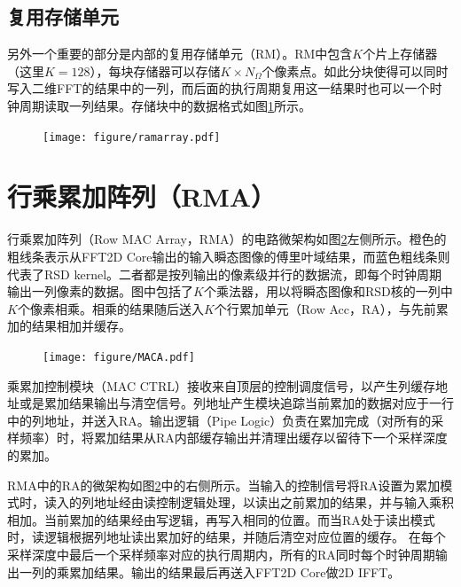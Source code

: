 \documentclass[master]{shtthesis}             %
\begin{document}
\subsection{复用存储单元}

另外一个重要的部分是内部的复用存储单元（RM）。RM中包含$K$个片上存储器（这里$K=128$），每块存储器可以存储$K\times N_\Omega$个像素点。如此分块使得可以同时写入二维FFT的结果中的一列，而后面的执行周期复用这一结果时也可以一个时钟周期读取一列结果。存储块中的数据格式如图\ref{fig:ram_array}所示。
\begin{figure}[!tb]
    \centering
    \texttt{[image: figure/ramarray.pdf]}
    \label{fig:ram_array}
\end{figure}

\section{行乘累加阵列（RMA）}

行乘累加阵列（Row MAC Array，RMA）的电路微架构如图\ref{fig:macarr}左侧所示。橙色的粗线条表示从FFT2D Core输出的输入瞬态图像的傅里叶域结果，而蓝色粗线条则代表了RSD kernel。二者都是按列输出的像素级并行的数据流，即每个时钟周期输出一列像素的数据。图中包括了$K$个乘法器，用以将瞬态图像和RSD核的一列中$K$个像素相乘。相乘的结果随后送入$K$个行累加单元（Row Acc，RA），与先前累加的结果相加并缓存。
\begin{figure}[!tb]
    \centering
    \texttt{[image: figure/MACA.pdf]}
    \label{fig:macarr}
\end{figure}
乘累加控制模块（MAC CTRL）接收来自顶层的控制调度信号，以产生列缓存地址或是累加结果输出与清空信号。列地址产生模块追踪当前累加的数据对应于一行中的列地址，并送入RA。输出逻辑（Pipe Logic）负责在累加完成（对所有的采样频率）时，将累加结果从RA内部缓存输出并清理出缓存以留待下一个采样深度的累加。

RMA中的RA的微架构如图\ref{fig:macarr}中的右侧所示。当输入的控制信号将RA设置为累加模式时，读入的列地址经由读控制逻辑处理，以读出之前累加的结果，并与输入乘积相加。当前累加的结果经由写逻辑，再写入相同的位置。而当RA处于读出模式时，读逻辑根据列地址读出累加好的结果，并随后清空对应位置的缓存。
在每个采样深度中最后一个采样频率对应的执行周期内，所有的RA同时每个时钟周期输出一列的乘累加结果。输出的结果最后再送入FFT2D Core做2D IFFT。
\end{document}
